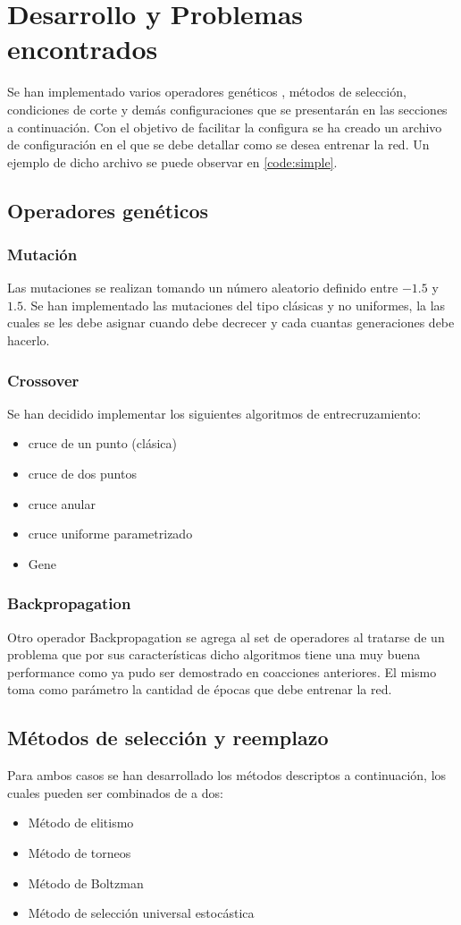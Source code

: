 \documentclass{sig-alternate}
\begin{document}
\section{Desarrollo y Problemas encontrados}
Se han implementado varios operadores genéticos , métodos de selección, condiciones de corte y demás configuraciones que se presentarán en las secciones a continuación. Con el objetivo de facilitar la configura se ha creado un archivo de configuración en el que se debe detallar como se desea entrenar la red. Un ejemplo de dicho archivo se puede observar en \ref{code:simple}.
	\subsection{Operadores genéticos}
	\subsubsection{Mutación}
	Las mutaciones se realizan tomando un número aleatorio definido entre $-1.5$ y $1.5$.
	Se han implementado las mutaciones del tipo clásicas y no uniformes, la las cuales se les debe asignar cuando debe decrecer y cada cuantas generaciones debe hacerlo.
	\subsubsection{Crossover}
	Se han decidido implementar los siguientes algoritmos de entrecruzamiento:
	\begin{itemize}
		\item cruce de un punto (clásica)
		\item cruce de dos puntos
		\item cruce anular
		\item cruce uniforme parametrizado
		 \item Gene

	\end{itemize}
	\subsubsection{Backpropagation}
	Otro operador Backpropagation se agrega al set de operadores al tratarse de un problema  que por sus características dicho algoritmos tiene una muy buena performance como ya pudo ser demostrado en coacciones anteriores. El mismo toma como parámetro la cantidad de épocas que debe entrenar la red.
	\subsection{Métodos de selección y reemplazo}
	Para ambos casos se han desarrollado los métodos descriptos a continuación, los cuales pueden ser combinados de a dos:
	\begin{itemize}
		\item Método de elitismo
		\item Método de torneos
		 \item Método de Boltzman
		 \item Método de selección universal estocástica
	\end{itemize}
\end{document}
